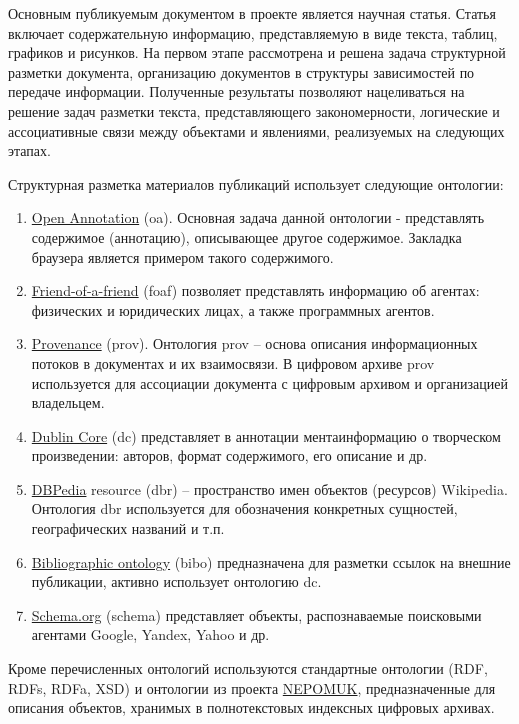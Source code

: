 \documentclass[a4paper,12pt,openany,final]{extreport}
\begin{document}
Основным публикуемым документом в проекте является научная статья.
Статья включает содержательную информацию, представляемую в виде текста,
таблиц, графиков и рисунков. На первом этапе рассмотрена и решена задача
структурной разметки документа, организацию документов в структуры
зависимостей по передаче информации. Полученные результаты позволяют
нацеливаться на решение задач разметки текста, представляющего
закономерности, логические и ассоциативные связи между объектами и
явлениями, реализуемых на следующих этапах.

Структурная разметка материалов публикаций использует следующие
онтологии:

\begin{enumerate}
\def\labelenumi{\arabic{enumi}.}
\item
  \href{http://www.openannotation.org/}{{Open Annotation}} (oa).
  Основная задача данной онтологии - представлять содержимое
  (аннотацию), описывающее другое содержимое. Закладка браузера является
  примером такого содержимого.
\item
  \href{http://xmlns.com/foaf/spec/}{{Friend-of-a-friend}} (foaf)
  позволяет представлять информацию об агентах: физических и юридических
  лицах, а также программных агентов.
\item
  \href{https://www.w3.org/TR/prov-o/}{{Provenance}} (prov). Онтология
  prov -- основа описания информационных потоков в документах и их
  взаимосвязи. В цифровом архиве prov используется для ассоциации
  документа с цифровым архивом и организацией владельцем.
\item
  \href{http://dublincore.org/documents/dcmi-terms/}{{Dublin Core}} (dc)
  представляет в аннотации ментаинформацию о творческом произведении:
  авторов, формат содержимого, его описание и др.
\item
  \href{http://wiki.dbpedia.org/}{{DBPedia}} resource (dbr) --
  пространство имен объектов (ресурсов) Wikipedia. Онтология dbr
  используется для обозначения конкретных сущностей, географических
  названий и т.п.
\item
  \href{http://bibliographic-ontology.org/specification}{{Bibliographic
  ontology}} (bibo) предназначена для разметки ссылок на внешние
  публикации, активно использует онтологию dc.
\item
  \href{http://schema.org/}{{Schema.org}} (schema) представляет объекты,
  распознаваемые поисковыми агентами Google, Yandex, Yahoo и др.
\end{enumerate}

Кроме перечисленных онтологий используются стандартные онтологии (RDF,
RDFs, RDFa, XSD) и онтологии из проекта
\href{https://userbase.kde.org/Nepomuk}{{NEPOMUK}}, предназначенные для
описания объектов, хранимых в полнотекстовых индексных цифровых архивах.
\end{document}
